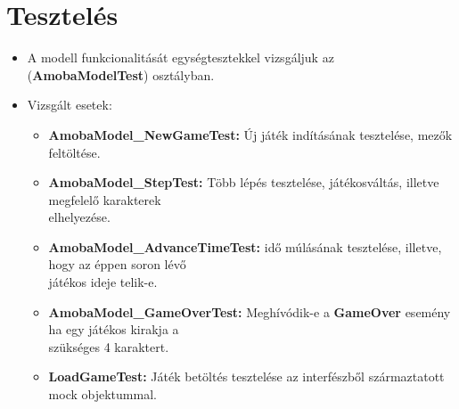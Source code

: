 \documentclass[11pt,a4paper]{article}
\begin{document}
\section{Tesztelés}
\begin{itemize}
	\item A modell funkcionalitását egységtesztekkel vizsgáljuk az
	(\textbf{AmobaModelTest}) osztályban.
	\item Vizsgált esetek:
	\begin{itemize}
		\item\textbf{AmobaModel\_NewGameTest:} Új játék indításának tesztelése, mezők
		feltöltése.
		\item\textbf{AmobaModel\_StepTest:} Több lépés tesztelése, játékosváltás, illetve
		megfelelő karakterek \\ elhelyezése.
		\item\textbf{AmobaModel\_AdvanceTimeTest:} idő múlásának tesztelése, illetve, hogy
		az éppen soron lévő \\ játékos ideje telik-e.
		\item\textbf{AmobaModel\_GameOverTest:} Meghívódik-e a \textbf{GameOver} esemény
		ha egy játékos kirakja a \\ szükséges 4 karaktert.
		\item\textbf{LoadGameTest:} Játék betöltés tesztelése az interfészből
		származtatott mock objektummal.
	\end{itemize}
\end{itemize}
\end{document}
